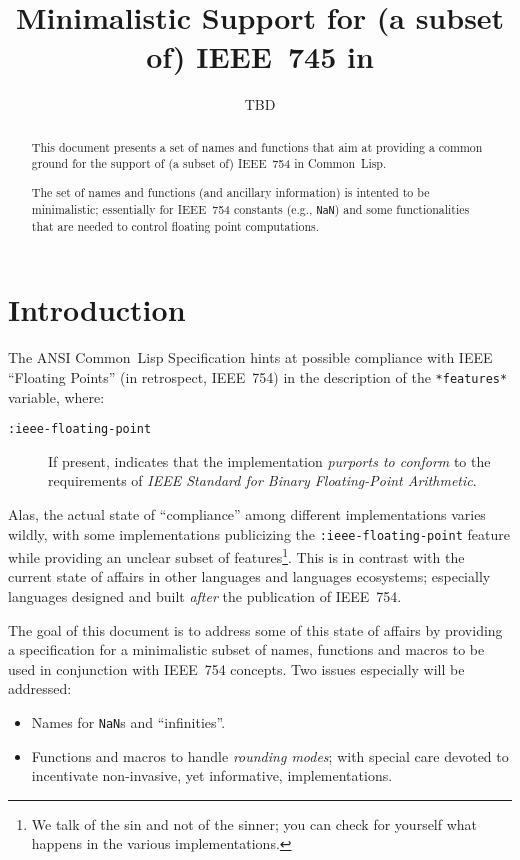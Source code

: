 \documentclass[10pt,fleqn]{article}
\title{
\LARGE{\bfseries Minimalistic Support for (a subset of) IEEE~745 in \CL{}}}
\author{TBD}
\newcommand{\CL}{\textsf{Common~Lisp}}
\newcommand{\marginnote}[1]{%
\marginpar{\begin{small}\begin{em}
{\raggedright #1}
\end{em}\end{small}}}
\newcommand{\code}[1]{\texttt{#1}}
\begin{document}
\maketitle

\begin{abstract}
This document presents a set of names and functions that aim at
providing a common ground for the support of (a subset of) IEEE~754 in
\CL{}.

The set of names and functions (and ancillary information) is intented
to be minimalistic; essentially for IEEE~754 constants (e.g.,
\code{NaN}) and some functionalities that are needed to control
floating point computations.
\end{abstract}


\section{Introduction}

The ANSI \CL{} Specification \cite{ANSIHyperSpec} hints at possible
compliance with IEEE ``Floating Points'' (in retrospect, IEEE~754) in
the description of the \code{*features*} variable, where:
\begin{description}
\item[\code{:ieee-floating-point}]
  If present, indicates that the
  implementation \emph{purports to conform}  to the requirements of
  \emph{IEEE Standard for Binary Floating-Point Arithmetic}. 
\end{description}

\noindent
Alas, the actual state of ``compliance'' among different
implementations varies wildly, with some implementations publicizing
the \code{:ieee-floating-point} feature while providing an unclear
subset of features\footnote{We talk of the sin and not of the sinner;
  you can check for yourself what happens in the various
  implementations.}.  This is in contrast with the current state of
affairs in other languages and languages ecosystems; especially
languages designed and built \emph{after} the publication of IEEE~754.

\vspace*{3mm}

The goal of this document is to address some of this state of affairs
by providing a specification for a minimalistic subset of
names,\marginnote{Not very ``minimalistic'' anymore\ldots}
functions and macros to be used in conjunction with IEEE~754
concepts.  Two issues especially will 
be addressed:
\begin{itemize}
\item Names for \code{NaN}s and ``infinities''.
\item Functions and macros to handle \emph{rounding modes}; with
  special care devoted to incentivate non-invasive, yet informative,
  implementations.
\end{itemize}
\end{document}
